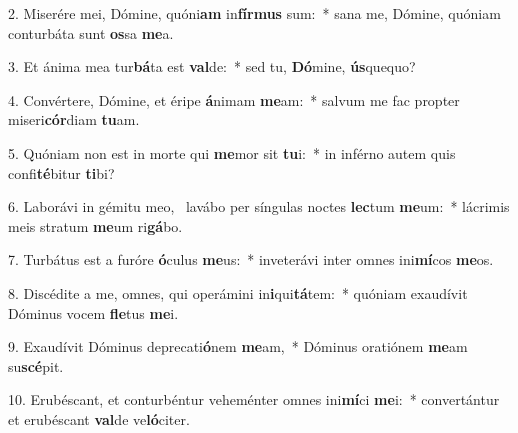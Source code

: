 2. Miserére mei, Dómine, quóni\textbf{am} in\textbf{fír}\textbf{mus} sum:~*  sana me, Dómine, quóniam conturbáta sunt \textbf{os}sa \textbf{me}a.\

3. Et ánima mea tur\textbf{bá}ta est \textbf{val}de:~*  sed tu, \textbf{Dó}mine, \textbf{ús}quequo?\

4. Convértere, Dómine, et éripe \textbf{á}nimam \textbf{me}am:~*  salvum me fac propter miseri\textbf{cór}diam \textbf{tu}am.\

5. Quóniam non est in morte qui \textbf{me}mor sit \textbf{tu}i:~*  in inférno autem quis confi\textbf{té}bitur \textbf{ti}bi?\

6. Laborávi in gémitu meo, \dag\  lavábo per síngulas noctes \textbf{lec}tum \textbf{me}um:~*  lácrimis meis stratum \textbf{me}um ri\textbf{gá}bo.\

7. Turbátus est a furóre \textbf{ó}culus \textbf{me}us:~*  inveterávi inter omnes ini\textbf{mí}cos \textbf{me}os.\

8. Discédite a me, omnes, qui operámini in\textbf{i}qui\textbf{tá}tem:~*  quóniam exaudívit Dóminus vocem \textbf{fle}tus \textbf{me}i.\

9. Exaudívit Dóminus deprecati\textbf{ó}nem \textbf{me}am,~*  Dóminus oratiónem \textbf{me}am su\textbf{scé}pit.\

10. Erubéscant, et conturbéntur veheménter omnes ini\textbf{mí}ci \textbf{me}i:~*  convertántur et erubéscant \textbf{val}de ve\textbf{ló}citer.\

